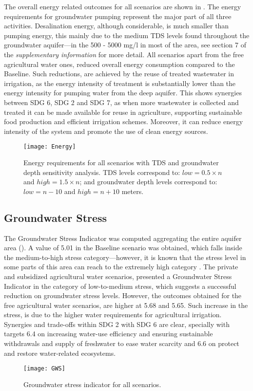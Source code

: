 The overall energy related outcomes for all scenarios are shown in . The energy requirements for groundwater pumping represent the major part of all three activities. Desalination energy, although considerable, is much smaller than pumping energy, this mainly due to the medium TDS levels found throughout the groundwater aquifer---in the 500 - 5000 mg/l in most of the area, see section 7 of the \textit{supplementary information} for more detail. All scenarios apart from the free agricultural water ones, reduced overall energy consumption compared to the Baseline. Such reductions, are achieved by the reuse of treated wastewater in irrigation, as the energy intensity of treatment is substantially lower than the energy intensity for pumping water from the deep aquifer. This shows synergies between SDG 6, SDG 2 and SDG 7, as when more wastewater is collected and treated it can be made available for reuse in agriculture, supporting sustainable food production and efficient irrigation schemes. Moreover, it can reduce energy intensity of the system and promote the use of clean energy sources.

\begin{figure*}[!t]
\texttt{[image: Energy]}
\caption{Energy requirements for all scenarios with TDS and groundwater depth sensitivity analysis. TDS levels correspond to: $low=0.5\times n$ and $high=1.5\times n$; and groundwater depth levels correspond to: $low=n-10$ and $high=n+10$ meters.}
\label{fig:energy}
\end{figure*}

\subsection{Groundwater Stress}
The Groundwater Stress Indicator was computed aggregating the entire aquifer area (). A value of 5.01 in the Baseline scenario was obtained, which falls inside the medium-to-high stress category---however, it is known that the stress level in some parts of this area can reach to the extremely high category \cite{herbertGlobalAssessmentCurrent2019}. The private and subsidized agricultural water scenarios, presented a Groundwater Stress Indicator in the category of low-to-medium stress, which suggests a successful reduction on groundwater stress levels. However, the outcomes obtained for the free agricultural water scenarios, are higher at 5.68 and 5.65. Such increase in the stress, is due to the higher water requirements for agricultural irrigation. Synergies and trade-offs within SDG 2 with SDG 6 are clear, specially with targets 6.4 on increasing water-use efficiency and ensuring sustainable withdrawals and supply of freshwater to ease water scarcity and 6.6 on protect and restore water-related ecosystems.
\begin{figure}[!h]
	\centering
	\texttt{[image: GWS]}
	\caption{Groundwater stress indicator for all scenarios.}
	\label{fig:gws}
\end{figure}

